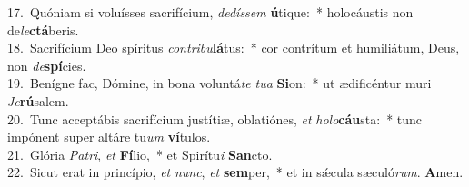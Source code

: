 {17.~}Quóniam si voluísses sacrifícium, \textit{de}\textit{dís}\textit{sem} \textbf{ú}tique:~* holocáustis non de\textit{le}\textbf{ctá}beris.\\
{18.~}Sacrifícium Deo spíritus \textit{con}\textit{tri}\textit{bu}\textbf{lá}tus:~* cor contrítum et humiliátum, Deus, non \textit{de}\textbf{spí}cies.\\
{19.~}Benígne fac, Dómine, in bona voluntá\textit{te} \textit{tu}\textit{a} \textbf{Si}on:~* ut ædificéntur muri \textit{Je}\textbf{rú}salem.\\
{20.~}Tunc acceptábis sacrifícium justítiæ, oblatiónes, \textit{et} \textit{ho}\textit{lo}\textbf{cáu}sta:~* tunc impónent super altáre tu\textit{um} \textbf{ví}tulos.\\
{21.~}Glória \textit{Pa}\textit{tri}, \textit{et} \textbf{Fí}lio,~* et Spirítu\textit{i} \textbf{San}cto.\\
{22.~}Sicut erat in princípio, \textit{et} \textit{nunc}, \textit{et} \textbf{sem}per,~* et in sǽcula sæculó\textit{rum}. \textbf{A}men.\\
